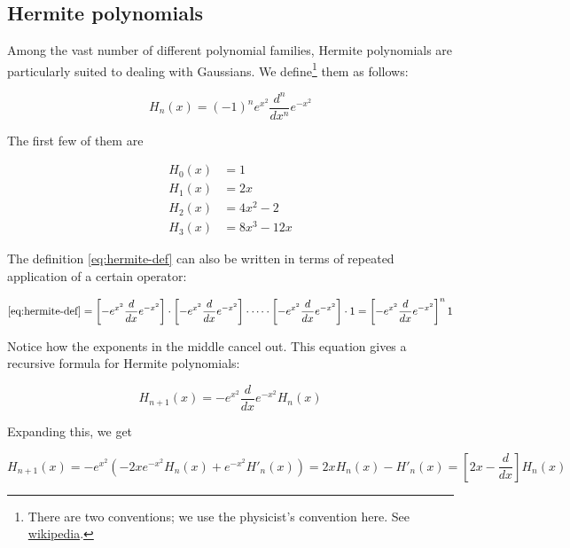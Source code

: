 \documentclass{article}
\begin{document}
\begin{appendices}

\newpage

\section{Hermite polynomials} \label{apx:hermite}

Among the vast number of different polynomial families, Hermite polynomials are particularly suited to dealing with Gaussians. We define\footnote{There are two conventions; we use the physicist's convention here. See \href{https://en.wikipedia.org/wiki/Hermite_polynomials}{wikipedia}.} them as follows:

\begin{equation} \label{eq:hermite-def}
H_n(x) = (-1)^n e^{x^2} \frac{d^n}{dx^n}e^{-x^2}
\end{equation}

The first few of them are

\begin{align}
H_0(x) &= 1 \\
H_1(x) &= 2x \\
H_2(x) &= 4x^2-2 \\
H_3(x) &= 8x^3-12x
\end{align}

The definition \eqref{eq:hermite-def} can also be written in terms of repeated application of a certain operator:

\begin{equation} \label{eq:hermite-def-op}
\eqref{eq:hermite-def} = \left[ -e^{x^2}\frac{d}{dx}e^{-x^2} \right]\cdot\left[ -e^{x^2}\frac{d}{dx}e^{-x^2} \right]\cdot\dots\cdot\left[ -e^{x^2}\frac{d}{dx}e^{-x^2} \right]\cdot 1 =
\left[ -e^{x^2}\frac{d}{dx}e^{-x^2} \right]^n 1
\end{equation}

Notice how the exponents in the middle cancel out. This equation gives a recursive formula for Hermite polynomials:

\begin{equation} \label{eq:hermite-rec-1}
H_{n+1}(x) = -e^{x^2}\frac{d}{dx}e^{-x^2} H_n(x)
\end{equation}

Expanding this, we get

\begin{equation} \label{eq:hermite-rec-2}
H_{n+1}(x) = -e^{x^2}\left(-2xe^{-x^2}H_n(x)+e^{-x^2}H'_n(x)\right) = 2xH_n(x) - H'_n(x) = \left[2x - \frac{d}{dx}\right] H_n(x)
\end{equation}


\end{appendices}
\end{document}
